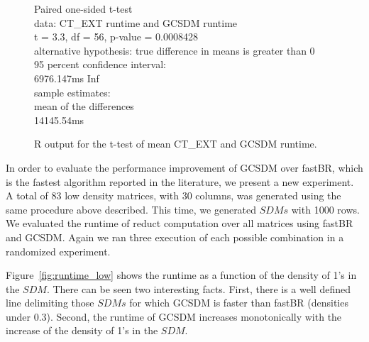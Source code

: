\documentclass[authoryear,11pt]{elsarticle}
\begin{document}
	\begin{figure}
		\qquad{}	Paired one-sided t-test\\

		data:  CT\_EXT runtime and GCSDM runtime\\
		t = 3.3, df = 56, p-value = 0.0008428\\
		alternative hypothesis: true difference in means is greater than 0\\
		95 percent confidence interval:\\
		 6976.147ms  \qquad{}  Inf\\
		sample estimates:\\
		mean of the differences \\
		 \qquad{}    14145.54ms
		 
		\centering
	  	\caption{R output for the t-test of mean CT\_EXT and GCSDM runtime.}
	  	\label{fig:R_GCSDM}
	\end{figure}
	
	In order to evaluate the performance improvement of GCSDM over fastBR, which is the fastest algorithm 
	reported in the literature, we present a new experiment. A total 	of 83 low density matrices, with 30 
	columns, was generated using the same procedure above described. This time, we generated $SDMs$ with 1000 
	rows. We evaluated the runtime of reduct computation over all matrices using fastBR and GCSDM. 
	Again we ran three execution of each possible combination in a randomized experiment.
	
	Figure~\ref{fig:runtime_low} shows the runtime as a function of the density of 1's in the $SDM$.
	There can be seen two interesting facts. First, there is a well defined
	line delimiting those $SDMs$ for which GCSDM is faster than fastBR (densities under 0.3). Second, the
	runtime of GCSDM increases monotonically with the increase of the density of 1's in the $SDM$.
	
\end{document}
